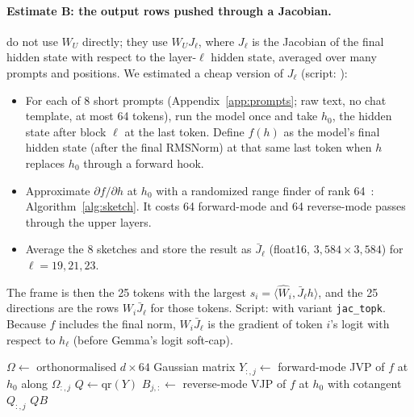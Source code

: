 \documentclass[11pt,a4paper]{article}
\newcommand{\WU}{W_U}
\begin{document}
\paragraph{Estimate B: the output rows pushed through a Jacobian.} \citet{gurnee2026verbalizable} do not use $\WU$ directly; they use $\WU J_\ell$, where $J_\ell$ is the Jacobian of the final hidden state with respect to the layer-$\ell$ hidden state, averaged over many prompts and positions. We estimated a cheap version of $J_\ell$ (script: ):
\begin{itemize}[leftmargin=1.6em,itemsep=0.1em]
\item For each of 8 short prompts (Appendix~\ref{app:prompts}; raw text, no chat template, at most 64 tokens), run the model once and take $h_0$, the hidden state after block $\ell$ at the last token. Define $f(h)$ as the model's final hidden state (after the final RMSNorm) at that same last token when $h$ replaces $h_0$ through a forward hook.
\item Approximate $\partial f/\partial h$ at $h_0$ with a randomized range finder of rank 64~\citep{halko2011structure}: Algorithm~\ref{alg:sketch}. It costs 64 forward-mode and 64 reverse-mode passes through the upper layers.
\item Average the 8 sketches and store the result as $\bar J_\ell$ (float16, $3{,}584\times3{,}584$) for $\ell=19,21,23$.
\end{itemize}
The frame is then the 25 tokens with the largest $s_i=\langle \hat W_i, \bar J_\ell h\rangle$, and the 25 directions are the rows $W_i\bar J_\ell$ for those tokens. Script:  with variant \texttt{jac\_topk}. Because $f$ includes the final norm, $W_i\bar J_\ell$ is the gradient of token $i$'s logit with respect to $h_\ell$ (before Gemma's logit soft-cap).

\begin{algorithm}[H]
\caption{Rank-64 sketch of $\partial f/\partial h$ at $h_0$ (\texttt{sketch\_J})}
\label{alg:sketch}
\begin{algorithmic}[1]
\State $\Omega \gets$ orthonormalised $d\times 64$ Gaussian matrix
 $Y_{:,j} \gets$ forward-mode JVP of $f$ at $h_0$ along $\Omega_{:,j}$ \EndFor
\State $Q \gets \mathrm{qr}(Y)$
 $B_{j,:} \gets$ reverse-mode VJP of $f$ at $h_0$ with cotangent $Q_{:,j}$ \EndFor
\State \Return $QB$
\end{algorithmic}
\end{algorithm}
\end{document}
